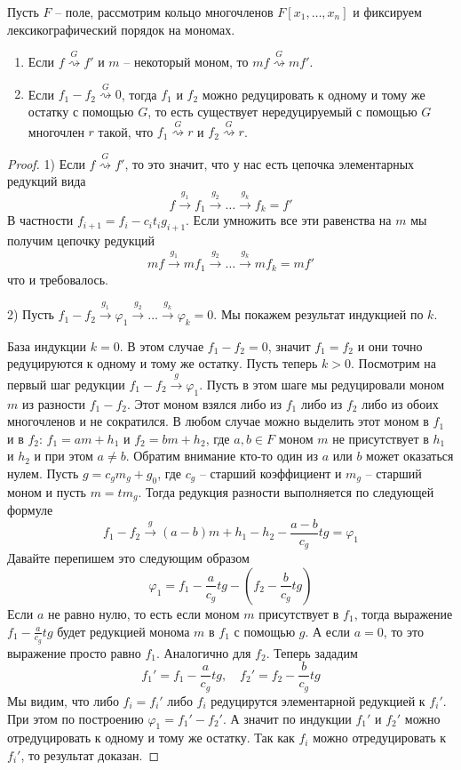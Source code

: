\begin{claim}
\label{claim::ReductionProps}
Пусть $F$ -- поле, рассмотрим кольцо многочленов  $F[x_1,\ldots,x_n]$ и фиксируем лексикографический порядок на мономах.
\begin{enumerate}
\item Если $f\stackrel{G}{\rightsquigarrow}f'$ и $m$ -- некоторый моном, то $mf \stackrel{G}{\rightsquigarrow}mf'$.

\item Если $f_1 - f_2 \stackrel{G}{\rightsquigarrow}0$, тогда $f_1$ и $f_2$ можно редуцировать к одному и тому же остатку с помощью $G$, то есть существует нередуцируемый с помощью $G$ многочлен $r$ такой, что $f_1\stackrel{G}{\rightsquigarrow}r$ и $f_2\stackrel{G}{\rightsquigarrow}r$.
\end{enumerate}
\end{claim}
\begin{proof}
1) Если $f\stackrel{G}{\rightsquigarrow}f'$, то это значит, что у нас есть цепочка элементарных редукций вида
\[
f\stackrel{g_1}{\longrightarrow}f_1 \stackrel{g_2}{\longrightarrow}\ldots  \stackrel{g_k}{\longrightarrow}f_k = f'
\]
В частности $f_{i+1} = f_i - c_i t_i g_{i+1}$.
Если умножить все эти равенства на $m$ мы получим цепочку редукций
\[
mf\stackrel{g_1}{\longrightarrow}mf_1 \stackrel{g_2}{\longrightarrow}\ldots  \stackrel{g_k}{\longrightarrow}mf_k =m f'
\]
что и требовалось.

2) Пусть $f_1 - f_2 \stackrel{g_1}{\longrightarrow}\varphi_1 \stackrel{g_2}{\longrightarrow}\ldots  \stackrel{g_k}{\longrightarrow}\varphi_k = 0$.
Мы покажем результат индукцией по $k$.

База индукции $k = 0$.
В этом случае $f_1 - f_2 = 0$, значит $f_1 = f_2$ и они точно редуцируются к одному и тому же остатку.
Пусть теперь $k > 0$.
Посмотрим на первый шаг редукции $f_1 - f_2 \stackrel{g}{\longrightarrow}\varphi_1$.
Пусть в этом шаге мы редуцировали моном $m$ из разности $f_1 - f_2$.
Этот моном взялся либо из $f_1$ либо из $f_2$ либо из обоих многочленов и не сократился.
В любом случае можно выделить этот моном в $f_1$ и в $f_2$: $f_1 = a m + h_1$ и $f_2 = bm + h_2$, где $a,b\in F$ моном $m$ не присутствует в $h_1$ и $h_2$  и при этом $a \neq b$.
Обратим внимание кто-то один из $a$ или $b$ может оказаться нулем.
Пусть $g = c_g m_g + g_0$, где $c_g$ -- старший коэффициент и $m_g$ -- старший моном и пусть $m = t m_g$.
Тогда редукция разности выполняется по следующей формуле
\[
f_1 - f_2 \stackrel{g}{\longrightarrow}(a-b)m + h_1 -h_2 - \frac{a-b}{c_g}t g = \varphi_1
\]
Давайте перепишем это следующим образом
\[
\varphi_1 = f_1 - \frac{a}{c_g}t g - \left(f_2 - \frac{b}{c_g}t g\right)
\]
Если $a$ не равно нулю, то есть если моном $m$ присутствует в $f_1$, тогда выражение $f_1 - \frac{a}{c_g}t g$ будет редукцией монома $m$ в $f_1$ с помощью $g$.
А если $a = 0$, то это выражение просто равно $f_1$.
Аналогично для $f_2$.
Теперь зададим
\[
f_1'=f_1 - \frac{a}{c_g}tg,\quad f_2'=f_2 - \frac{b}{c_g}tg
\]
Мы видим, что либо $f_i = f_i'$ либо $f_i$ редуцирутся элементарной редукцией к $f_i'$.
При этом по построению $\varphi_1 = f_1' - f_2'$.
А значит по индукции $f_1'$ и $f_2'$ можно отредуцировать к одному и тому же остатку.
Так как $f_i$ можно отредуцировать к $f_i'$, то результат доказан.
\end{proof}

